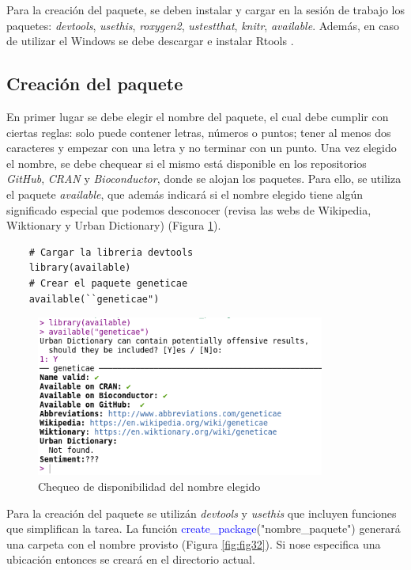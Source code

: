 Para la creación del paquete, se deben instalar y cargar en la sesión de trabajo los paquetes:
 \emph{devtools}, \emph{usethis}, \emph{roxygen2}, \emph{ustestthat}, \emph{knitr}, \emph{available}. Además, en caso de utilizar el Windows se debe descargar e instalar Rtools .


\subsection{Creación del paquete}

En primer lugar se debe elegir el nombre del paquete, el cual debe cumplir con ciertas reglas: solo puede contener letras, números o puntos; tener al menos dos caracteres y empezar con una letra y no terminar con un punto. Una vez elegido el nombre, se debe chequear si el mismo está disponible en los repositorios \emph{GitHub}, \emph{CRAN} y \emph{Bioconductor}, donde se alojan los paquetes. Para ello, se utiliza el paquete \emph{available}, que además indicará si el nombre elegido tiene algún significado especial que podemos desconocer (revisa las webs de Wikipedia, Wiktionary y Urban Dictionary) (Figura \ref{fig:fig31}). 

\begin{lstlisting}
	# Cargar la libreria devtools
	library(available)
	# Crear el paquete geneticae
	available(``geneticae")
\end{lstlisting}


 \begin{figure}[H]
\begin{center}
	\includegraphics[width=9.5cm]{./Graficos/available.png}	
\end{center}
	\caption{Chequeo de disponibilidad del nombre elegido}
\label{fig:fig31}
\end{figure}


Para la creación del paquete se utilizán  \emph{devtools} y  \emph{usethis} que incluyen funciones que simplifican la tarea. La función \textcolor{blue}{create\_package}("nombre\_paquete") generará una carpeta con el nombre provisto (Figura \ref{fig:fig32}). Si nose especifica una ubicación entonces se creará en el directorio actual.


